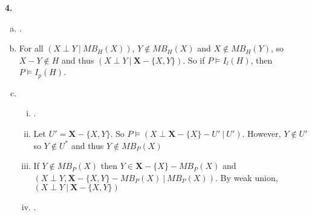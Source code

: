 \documentclass{article}
\begin{document}
\textbf{4.} \begin{enumerate}[(a)]
    \item .
    \item For all $(X \perp Y\ |\ MB_H(X))$, $Y \notin MB_H(X)$ and $X \notin MB_H(Y)$, so $X - Y \notin H$ and thus $(X \perp Y\ |\ \mathbf{X} - \{X, Y \})$. So if $P \vDash I_{l}(H)$, then $P \vDash I_{p}(H)$.
    \item \begin{enumerate}[(i)]
        \item .
        \item Let $U' = \mathbf{X} - \{X, Y\}$. So $P \vDash (X \perp \mathbf{X} - \{X\} - U'\ |\ U')$. However, $Y \notin U'$ so $Y \notin U^*$ and thus $Y \notin MB_P(X)$
        \item If $Y \notin MB_P(X)$ then $Y \in \mathbf{X} - \{X\} - MB_P(X)$ and $(X \perp Y, \mathbf{X} - \{X, Y\} - MB_P(X)\ |\ MB_P(X) )$. By weak union,  $(X \perp Y\ |\ \mathbf{X} - \{X, Y\})$
        \item .
    \end{enumerate}
\end{enumerate}
\end{document}
